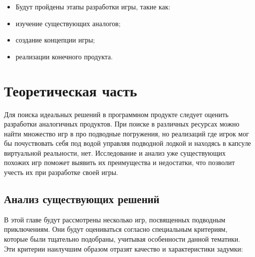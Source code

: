 \documentclass{../mirea-prog-lang}
\begin{document}
\begin{itemize}
	\item[] Будут пройдены этапы разработки игры, такие как:
	\item изучение существующих аналогов;
	\item создание концепции игры;
	\item реализации конечного продукта.
\end{itemize}

\section{Теоретическая часть}

Для поиска идеальных решений в программном продукте следует оценить разработки аналогичных продуктов.
При поиске в различных ресурсах можно найти множество игр в про подводные погружения, но реализаций где игрок мог бы почуствовать себя под водой управляя подводной лодкой и находясь в капсуле виртуальной реальности, нет. Исследование и анализ уже существующих похожих игр поможет выявить их преимущества и недостатки, что позволит учесть их при разработке своей игры.

\subsection{Анализ существующих решений}

В этой главе будут рассмотрены несколько игр, посвященных подводным приключениям. Они будут оцениваться согласно специальным критериям, которые были тщательно подобраны, учитывая особенности данной тематики. Эти критерии наилучшим образом отразят качество и характеристики задумки:
\end{document}
